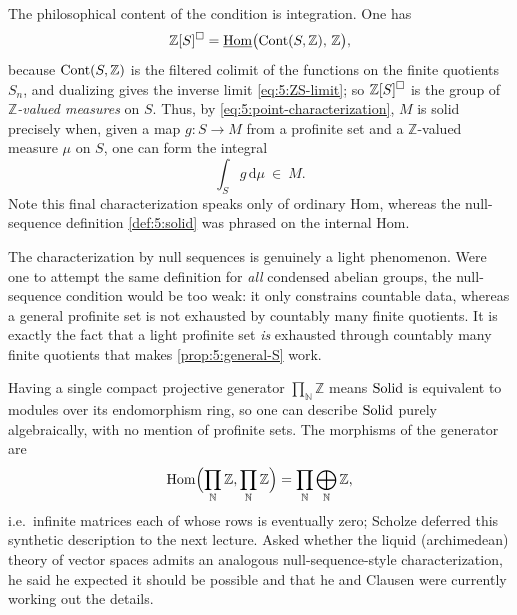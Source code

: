 \begin{remark}
\label{rmk:5:measures}
The philosophical content of the condition is integration. One has
\begin{equation*}
\mathbb{Z}[S]^{\square}=\underline{\operatorname{Hom}}\bigl(\operatorname{Cont}(S,\mathbb{Z}),\,\mathbb{Z}\bigr),
\end{equation*}
because $\operatorname{Cont}(S,\mathbb{Z})$ is the filtered colimit of the functions on the
finite quotients $S_n$, and dualizing gives the inverse limit
\eqref{eq:5:ZS-limit}; so $\mathbb{Z}[S]^{\square}$ is the group of
\emph{$\mathbb{Z}$-valued measures} on $S$. Thus, by \eqref{eq:5:point-characterization},
$M$ is solid precisely when, given a map $g\colon S\to M$ from a profinite set and
a $\mathbb{Z}$-valued measure $\mu$ on $S$, one can form the integral
\begin{equation*}
\int_{S}g\,\mathrm{d}\mu\ \in\ M .
\end{equation*}
Note this final characterization speaks only of ordinary Hom, whereas the
null-sequence definition \cref{def:5:solid} was phrased on the internal Hom.
\end{remark}

\begin{remark}
\label{rmk:5:lightness-essential}
The characterization by null sequences is genuinely a light phenomenon. Were one
to attempt the same definition for \emph{all} condensed abelian groups, the
null-sequence condition would be too weak: it only constrains countable data,
whereas a general profinite set is not exhausted by countably many finite
quotients. It is exactly the fact that a light profinite set \emph{is} exhausted
through countably many finite quotients that makes \cref{prop:5:general-S} work.
\end{remark}

\begin{remark}
\label{rmk:5:synthetic-and-liquid}
Having a single compact projective generator $\prod_{\mathbb{N}}\mathbb{Z}$ means
$\mathrm{Solid}$ is equivalent to modules over its endomorphism ring, so one can describe
$\mathrm{Solid}$ purely algebraically, with no mention of profinite sets. The morphisms of
the generator are
\begin{equation*}
\operatorname{Hom}\Bigl(\prod_{\mathbb{N}}\mathbb{Z},\prod_{\mathbb{N}}\mathbb{Z}\Bigr)
=\prod_{\mathbb{N}}\bigoplus_{\mathbb{N}}\mathbb{Z},
\end{equation*}
i.e.\ infinite matrices each of whose rows is eventually zero; Scholze deferred
this synthetic description to the next lecture. Asked whether the liquid
(archimedean) theory of vector spaces admits an analogous null-sequence-style
characterization, he said he expected it should be possible and that he and
Clausen were currently working out the details.
\end{remark}
